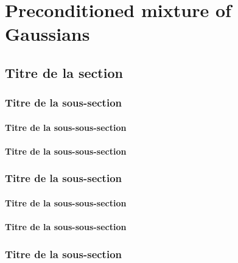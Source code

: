 \chapter{Preconditioned mixture of Gaussians} %


\section{Titre de la section}
\subsection{Titre de la sous-section}

\subsubsection{Titre de la sous-sous-section}
\subsubsection{Titre de la sous-sous-section}


\subsection{Titre de la sous-section}

\subsubsection{Titre de la sous-sous-section}

\subsubsection{Titre de la sous-sous-section}

\subsection{Titre de la sous-section}
\cite{Faulkes2013}

